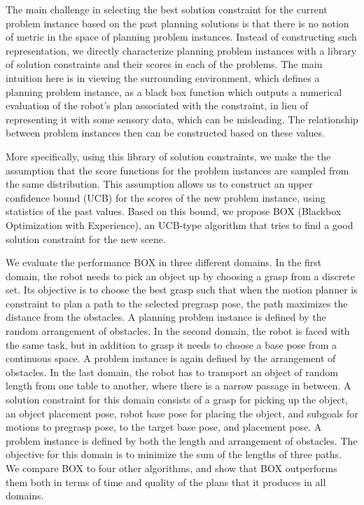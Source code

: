 The main challenge in selecting the best 
solution constraint for the current problem
instance based on the past planning solutions is that 
there is no notion of metric in the space of 
planning problem instances. Instead of constructing
such representation, we directly characterize 
planning problem instances with a library
of solution constraints and their scores in each
of the problems. The main intuition 
here is in viewing the surrounding environment, which defines a 
planning problem instance, as a black box function
which outputs a numerical evaluation of 
the robot's plan associated with the constraint, in lieu of representing
it with some sensory data, which can be misleading.
The relationship between problem instances then can be
constructed based on these values.

More specifically, using this library of solution constraints, we make the
the assumption that the score functions for the problem instances
are sampled from the same distribution. This assumption allows us 
to construct an upper confidence bound (UCB) for the scores
of the new problem instance, using statistics of the past values. 
Based on this bound, we propose BOX (Blackbox Optimization with Experience),
an UCB-type algorithm that tries to find a good solution constraint
for the new scene.

We evaluate the performance BOX in three different domains. In
the first domain, the robot needs to pick an object up by choosing a grasp from
a discrete set. Its objective is to choose the best grasp such that
when the motion planner is constraint to plan a path to the selected pregrasp pose,
the path maximizes the distance from the obstacles. A planning
problem instance is defined by the random arrangement of obstacles.
In the second domain, the robot is faced with the same task, but in addition
to grasp it needs to choose a base pose from a continuous space. A
problem instance is again defined by the arrangement of obstacles.
In the last domain, the robot has to transport an object of random
length from one table to another, where there is a narrow passage in between.
A solution constraint for this domain consists of a grasp for picking
up the object, an object placement pose, robot base pose for
placing the object, and subgoals for motions to pregrasp pose,
to the target base pose, and placement pose. A problem
instance is defined by both the length and arrangement of obstacles. The objective
for this domain is to minimize the sum of the lengths of three paths. 
We compare BOX to four other algorithms, and show that BOX outperforms them both
in terms of time and quality of the plans that it produces in all domains.
